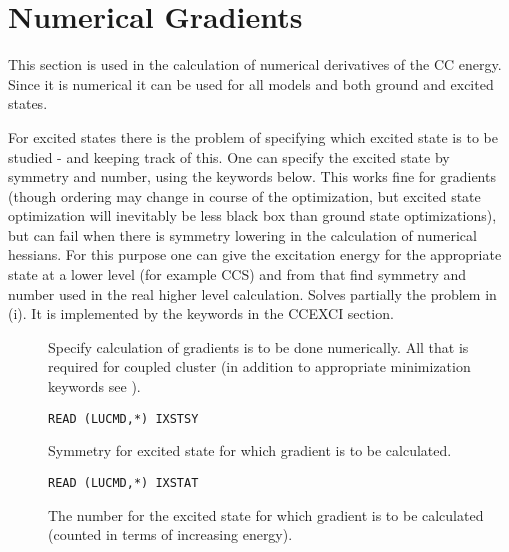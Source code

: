 %
\section{Numerical Gradients}\label{sec:ccgr}
%

This section is used in the calculation of numerical derivatives
of the CC energy. Since it is numerical it can be used for all models
and both ground and excited states.

For excited states there is the problem of specifying 
which excited state is to be studied - and keeping track of this.
One can specify the excited state by symmetry and number, using the keywords below.
This works fine for gradients (though ordering may change in course of the
optimization, but excited state optimization will inevitably be less black box
than ground state optimizations), but can fail when there is symmetry lowering
in the calculation of numerical hessians. 
For this purpose one can give the excitation energy for the appropriate state at a lower level 
(for example CCS) and from that find symmetry and number used in the real higher level calculation.
Solves partially the problem in (i). It is implemented by the keywords in the CCEXCI section.

\begin{description}

\item[] 

Specify calculation of gradients is to be done numerically.
All that is required for coupled cluster (in addition to appropriate minimization
keywords see ).

\item[] 

\verb|READ (LUCMD,*) IXSTSY|\newline

Symmetry for excited state for which gradient is to be calculated.

\item[] 

\verb|READ (LUCMD,*) IXSTAT|\newline

The number for the excited state for which gradient is to be calculated 
(counted in terms of increasing energy).

\end{description}
